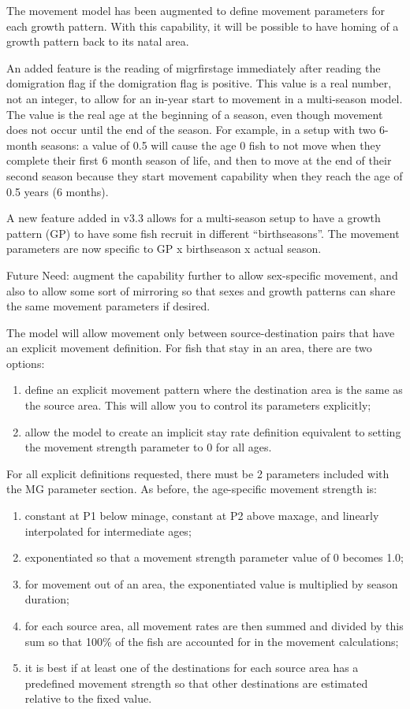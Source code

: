 The movement model has been augmented to define movement parameters for each growth pattern.  With this capability, it will be possible to have homing of a growth pattern back to its natal area.

An added feature is the reading of migr\textunderscore firstage immediately after reading the do\textunderscore migration flag if the do\textunderscore migration flag is positive.  This value is a real number, not an integer, to allow for an in-year start to movement in a multi-season model.  The value is the real age at the beginning of a season, even though movement does not occur until the end of the season.  For example, in a  setup with two 6-month seasons:  a value of 0.5 will cause the age 0 fish to not move when they complete their first 6 month season of life, and then to move at the end of their second season because they start movement capability when they reach the age of 0.5 years (6 months).

A new feature added in v3.3 allows for a multi-season setup to have a growth pattern (GP) to have some fish recruit in different “birthseasons”.  The movement parameters are now specific to GP x birthseason x actual season.

Future Need:  augment the capability further to allow sex-specific movement, and also to allow some sort of mirroring so that sexes and growth patterns can share the same movement parameters if desired.

The model will allow movement only between source-destination pairs that have an explicit movement definition.  For fish that stay in an area, there are two options:
\begin{enumerate}
	\item define an explicit movement pattern where the destination area is the same as the source area.  This will allow you to control its parameters explicitly;
	\item allow the model to create an implicit stay rate definition equivalent to setting the movement strength parameter to 0 for all ages.
\end{enumerate}

For all explicit definitions requested, there must be 2 parameters included with the MG parameter section.  As before, the age-specific movement strength is:
\begin{enumerate}
	\item constant at P1 below minage, constant at P2 above maxage, and linearly interpolated for intermediate ages;
	\item exponentiated so that a movement strength parameter value of 0 becomes 1.0;
	\item for movement out of an area, the exponentiated value is multiplied by season duration;
	\item for each source area, all movement rates are then summed and divided by this sum so that 100\% of the fish are accounted for in the movement calculations;
	\item it is best if at least one of the destinations for each source area has a predefined movement strength so that other destinations are estimated relative to the fixed value.
\end{enumerate}

